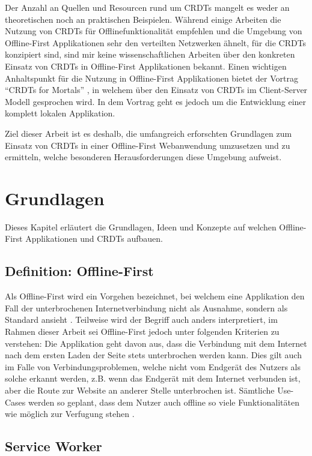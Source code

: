 \documentclass[a4paper, 12pt]{scrreprt}
\begin{document}
Der Anzahl an Quellen und Resourcen rund um CRDTs mangelt es weder an theoretischen noch an praktischen Beispielen. Während einige Arbeiten die Nutzung von CRDTs für Offlinefunktionalität empfehlen und die Umgebung von Offline-First Applikationen sehr den verteilten Netzwerken ähnelt, für die CRDTs konzipiert sind, sind mir keine wissenschaftlichen Arbeiten über den konkreten Einsatz von CRDTs in Offline-First Applikationen bekannt. Einen wichtigen Anhaltspunkt für die Nutzung in Offline-First Applikationen bietet der Vortrag \enquote{CRDTs for Mortals} \autocite{OnlineCrdtsForMortals}, in welchem über den Einsatz von CRDTs im Client-Server Modell gesprochen wird. In dem Vortrag geht es jedoch um die Entwicklung einer komplett lokalen Applikation.

Ziel dieser Arbeit ist es deshalb, die umfangreich erforschten Grundlagen zum Einsatz von CRDTs in einer Offline-First Webanwendung umzusetzen und zu ermitteln, welche besonderen Herausforderungen diese Umgebung aufweist.

\chapter{Grundlagen}
Dieses Kapitel erläutert die Grundlagen, Ideen und Konzepte auf welchen Offline-First Applikationen und CRDTs aufbauen. 
\section{Definition: Offline-First}\label{sec:DefinitionOfflineFirst}
Als Offline-First wird ein Vorgehen bezeichnet, bei welchem eine Applikation den Fall der unterbrochenen Internetverbindung nicht als Ausnahme, sondern als Standard ansieht \autocite{OnlineGoogleProgressiveWebApps}. Teilweise wird der Begriff auch anders interpretiert, im Rahmen dieser Arbeit sei Offline-First jedoch unter folgenden Kriterien zu verstehen: Die Applikation geht davon aus, dass die Verbindung mit dem Internet nach dem ersten Laden der Seite stets unterbrochen werden kann. Dies gilt auch im Falle von Verbindungsproblemen, welche nicht vom Endgerät des Nutzers als solche erkannt werden, z.B. wenn das Endgerät mit dem Internet verbunden ist, aber die Route zur Website an anderer Stelle unterbrochen ist. Sämtliche Use-Cases werden so geplant, dass dem Nutzer auch offline so viele Funktionalitäten wie möglich zur Verfugung stehen \autocite{ArticleDesigningOfflineFirst}.



\section{Service Worker}
\label{sec:serviceworker}
\end{document}

